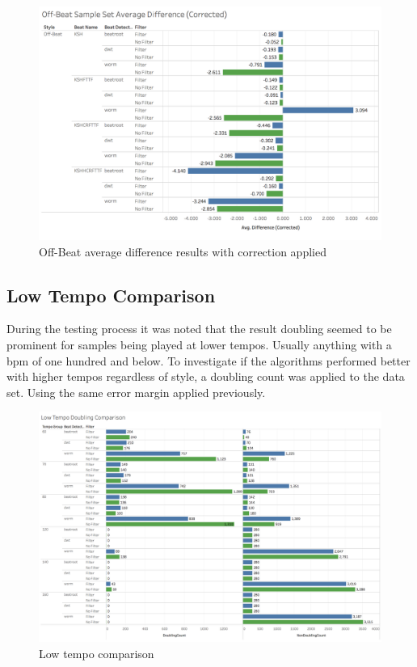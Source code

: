 \documentclass[a4paper, 11pt]{article}
\begin{document}
\begin{figure}[htbp]
\centering
\includegraphics[scale=.25]{images/OBSSADC.jpg}
\caption{Off-Beat average difference results with correction applied}
\label{fig: offAveDiffCor}
\end{figure}

\subsection{Low Tempo Comparison}
During the testing process it was noted that the result doubling seemed to be prominent for samples being played at lower tempos. Usually anything with a bpm of one hundred and below. To investigate if the algorithms performed better with higher tempos regardless of style, a doubling count was applied to the data set. Using the same error margin applied previously. 

\begin{figure}
\centering
\includegraphics[scale=0.25]{images/LowDoubling.jpg}
\caption{Low tempo comparison}
\label{fig: lowTemCom}
\end{figure}
\end{document}
